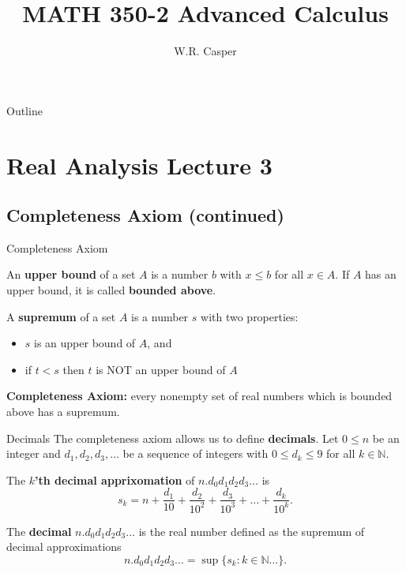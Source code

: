 \documentclass{beamer}
\title{MATH 350-2 Advanced Calculus}
\subtitle
{} %
\author[W.R. Casper] %
{W.R. Casper}
\institute[California State University Fullerton] %
{
  Department of Mathematics\\
  California State University Fullerton}
\begin{document}
\begin{frame}
  \titlepage
\end{frame}

\begin{frame}{Outline}
  \tableofcontents
\end{frame}



\section{Real Analysis Lecture 3}

\subsection{Completeness Axiom (continued)}

\begin{frame}{Completeness Axiom}
\pause
\begin{defn}
An \textbf{upper bound} of a set $A$ is a number $b$ with $x\leq b$ for all $x\in A$.  If $A$ has an upper bound, it is called \textbf{bounded above}.
\end{defn}
\pause
\begin{defn}
A \textbf{supremum} of a set $A$ is a number $s$ with two properties:
\begin{itemize}
\pause
\item $s$ is an upper bound of $A$, and
\pause
\item if $t < s$ then $t$ is NOT an upper bound of $A$
\end{itemize}
\end{defn}
\pause
\textbf{Completeness Axiom:} every nonempty set of real numbers which is bounded above has a supremum.
\end{frame}

\begin{frame}{Decimals}
The completeness axiom allows us to define \textbf{decimals}.
\pause
Let $0\leq n$ be an integer and $d_1,d_2,d_3,\dots$ be a sequence of integers with $0\leq d_k\leq 9$ for all $k\in\mathbb{N}$.  
\pause
\begin{defn}
The \textbf{$k$'th decimal apprixomation} of $n.d_0d_1d_2d_3\dots$ is
$$s_k = n+\frac{d_1}{10} + \frac{d_2}{10^2} + \frac{d_3}{10^3} + \dots + \frac{d_k}{10^k}.$$
\end{defn}
\pause
\begin{defn}
The \textbf{decimal} $n.d_0d_1d_2d_3\dots$ is the real number defined as the supremum of decimal approximations
$$n.d_0d_1d_2d_3\dots = \sup\{ s_k: k\in\mathbb N\dots\}.$$
\end{defn}
\end{frame}
\end{document}
